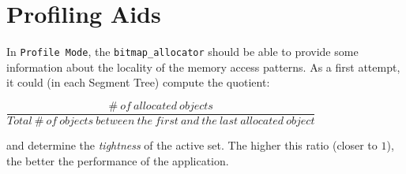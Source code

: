 \documentclass{article}
\begin{document}
\section{Profiling Aids}

In \texttt{Profile Mode}, the \texttt{bitmap\_allocator} should be
able to provide some information about the locality of the memory
access patterns. As a first attempt, it could (in each Segment Tree)
compute the quotient:

$\dfrac{\#\ of\ allocated\ objects}{Total\ \#\ of\ objects\ between\ the\ first\ and\ the\ last\ allocated\ object}$

and determine the \textit{tightness} of the active set. The higher
this ratio (closer to $1$), the better the performance of the
application.
\end{document}
